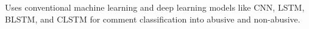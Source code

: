 Uses conventional machine learning and deep learning models like CNN, LSTM, BLSTM, and CLSTM for comment classification into abusive and non-abusive.

